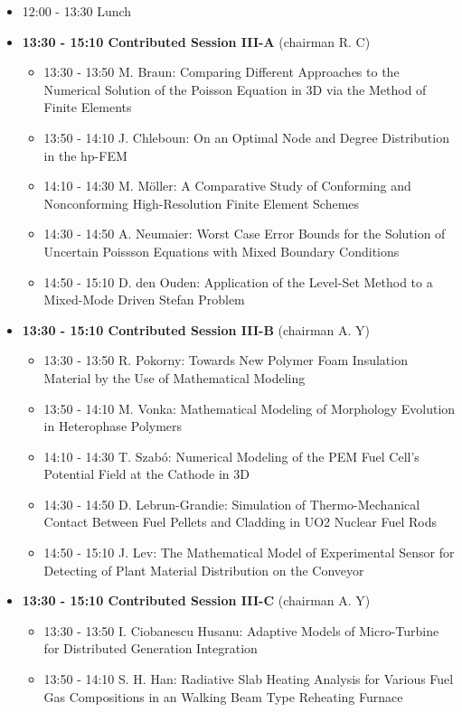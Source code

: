 \documentclass[10pt, A4]{article}%
\begin{document}
\begin{itemize}
\begin{itemize}
  \end{itemize}
  \item 12:00 - 13:30 Lunch
  \item {\bf 13:30 - 15:10 Contributed Session III-A} (chairman R. C) 
  \begin{itemize}
    \item 13:30 - 13:50 M. Braun: Comparing Different Approaches to the Numerical Solution of the Poisson Equation in 3D via the Method of Finite Elements
    \item 13:50 - 14:10 J. Chleboun: On an Optimal Node and Degree Distribution in the hp-FEM
    \item 14:10 - 14:30 M. M\"{o}ller: A Comparative Study of Conforming and Nonconforming High-Resolution Finite Element Schemes
    \item 14:30 - 14:50 A. Neumaier: Worst Case Error Bounds for the Solution of Uncertain Poissson Equations with Mixed Boundary Conditions
    \item 14:50 - 15:10 D. den Ouden: Application of the Level-Set Method to a Mixed-Mode Driven Stefan Problem
  \end{itemize}
  \item {\bf 13:30 - 15:10 Contributed Session III-B} (chairman A. Y) 
  \begin{itemize}
    \item 13:30 - 13:50 R. Pokorny: Towards New Polymer Foam Insulation Material by the Use of Mathematical Modeling
    \item 13:50 - 14:10 M. Vonka: Mathematical Modeling of Morphology Evolution in Heterophase Polymers
    \item 14:10 - 14:30 T. Szab\'{o}: Numerical Modeling of the PEM Fuel Cell’s Potential Field at the Cathode in 3D
    \item 14:30 - 14:50 D. Lebrun-Grandie: Simulation of Thermo-Mechanical Contact Between Fuel Pellets and Cladding in UO2 Nuclear Fuel Rods
    \item 14:50 - 15:10 J. Lev: The Mathematical Model of Experimental Sensor for Detecting of Plant Material Distribution on the Conveyor
  \end{itemize}
    \item {\bf 13:30 - 15:10 Contributed Session III-C} (chairman A. Y) 
  \begin{itemize}
    \item 13:30 - 13:50 I. Ciobanescu Husanu: Adaptive Models of Micro-Turbine for Distributed Generation Integration 
    \item 13:50 - 14:10 S. H. Han: Radiative Slab Heating Analysis for Various Fuel Gas Compositions in an Walking Beam Type Reheating Furnace

\end{itemize}
\end{itemize}
\end{document}
